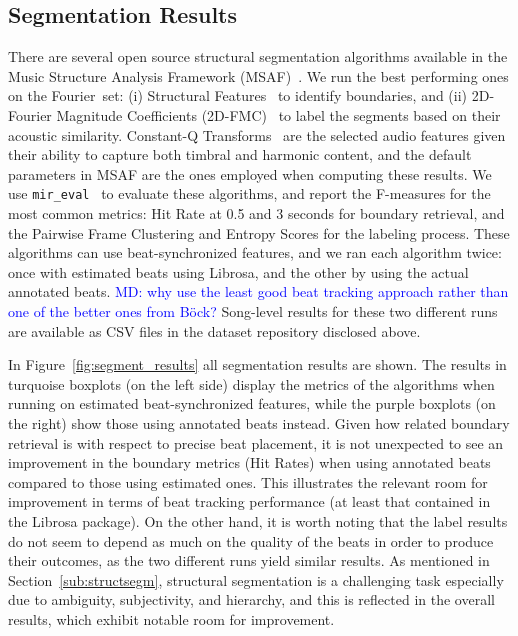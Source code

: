 \documentclass{article}
\newcommand{\setName}{Fourier}
\newcommand{\MD}[1]{\textcolor{blue}{MD: #1}}
\begin{document}
\subsection{Segmentation Results}

There are several open source structural segmentation algorithms available in the Music Structure Analysis Framework (MSAF)~\cite{Nieto2016}.
We run the best performing ones on the \setName~set: (i) Structural Features~\cite{Serra2014} to identify boundaries, and (ii) 2D-Fourier Magnitude Coefficients (2D-FMC)~\cite{Nieto2014} to label the segments based on their acoustic similarity.
Constant-Q Transforms~\cite{Schorkhuber2010} are the selected audio features given their ability to capture both timbral and harmonic content, and the default parameters in MSAF are the ones employed when computing these results.
We use \texttt{mir\_eval}~\cite{Raffel2014} to evaluate these algorithms, and report the F-measures for the most common metrics: Hit Rate at 0.5 and 3 seconds for boundary retrieval, and the Pairwise Frame Clustering and Entropy Scores for the labeling process.
These algorithms can use beat-synchronized features, and we ran each algorithm twice: once with estimated beats using Librosa, and the other by using the actual annotated beats. \MD{why use the least good beat tracking approach rather than one of the better ones from B\"{o}ck?}
Song-level results for these two different runs are available as CSV files in the dataset repository disclosed above.

In Figure~\ref{fig:segment_results} all segmentation results are shown.
The results in turquoise boxplots (on the left side) display the metrics of the algorithms when running on estimated beat-synchronized features, while the purple boxplots (on the right) show those using annotated beats instead.
Given how related boundary retrieval is with respect to precise beat placement, it is not unexpected to see an improvement in the boundary metrics (Hit Rates) when using annotated beats compared to those using estimated ones.
This illustrates the relevant room for improvement in terms of beat tracking performance (at least that contained in the Librosa package).
On the other hand, it is worth noting that the label results do not seem to depend as much on the quality of the beats in order to produce their outcomes, as the two different runs yield similar results.
As mentioned in Section~\ref{sub:structsegm}, structural segmentation is a challenging task especially due to ambiguity, subjectivity, and hierarchy, and this is reflected in the overall results, which exhibit notable room for improvement.
\end{document}
